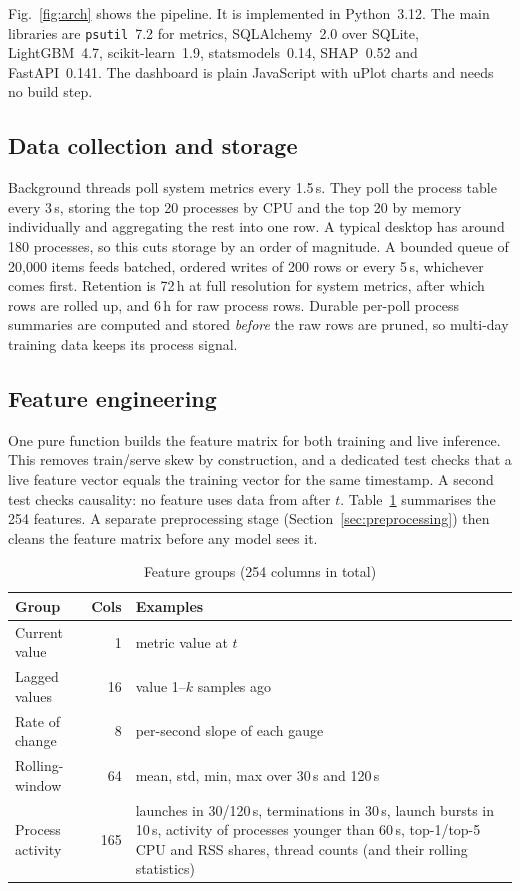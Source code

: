 \documentclass[conference]{IEEEtran}
\begin{document}
Fig.~\ref{fig:arch} shows the pipeline. It is implemented in Python~3.12. The
main libraries are \texttt{psutil}~7.2 for metrics, SQLAlchemy~2.0 over
SQLite, LightGBM~4.7, scikit-learn~1.9, statsmodels~0.14, SHAP~0.52 and
FastAPI~0.141. The dashboard is plain JavaScript with uPlot charts and needs no
build step.

\subsection{Data collection and storage}
Background threads poll system metrics every 1.5\,s. They poll the process
table every 3\,s, storing the top 20 processes by CPU and the top 20 by memory
individually and aggregating the rest into one row. A typical desktop has
around 180 processes, so this cuts storage by an order of magnitude. A bounded
queue of 20{,}000 items feeds batched, ordered writes of 200 rows or every
5\,s, whichever comes first. Retention is 72\,h at full resolution for system
metrics, after which rows are rolled up, and 6\,h for raw process rows.
Durable per-poll process summaries are computed and stored \emph{before} the
raw rows are pruned, so multi-day training data keeps its process signal.

\subsection{Feature engineering}
One pure function builds the feature matrix for both training and live
inference. This removes train/serve skew by construction, and a dedicated test
checks that a live feature vector equals the training vector for the same
timestamp. A second test checks causality: no feature uses data from after
$t$. Table~\ref{tab:features} summarises the 254 features. A separate
preprocessing stage (Section~\ref{sec:preprocessing}) then cleans the
feature matrix before any model sees it.

\begin{table}[t]
\centering
\caption{Feature groups (254 columns in total)}
\label{tab:features}
\begin{tabular}{@{}p{2.1cm}rp{4.6cm}@{}}
\toprule
Group & Cols & Examples \\
\midrule
Current value  & 1   & metric value at $t$ \\
Lagged values  & 16  & value 1--$k$ samples ago \\
Rate of change & 8   & per-second slope of each gauge \\
Rolling-window & 64  & mean, std, min, max over 30\,s and 120\,s \\
Process activity & 165 & launches in 30/120\,s, terminations in 30\,s, launch bursts in 10\,s, activity of processes younger than 60\,s, top-1/top-5 CPU and RSS shares, thread counts (and their rolling statistics) \\
\bottomrule
\end{tabular}
\end{table}
\end{document}
